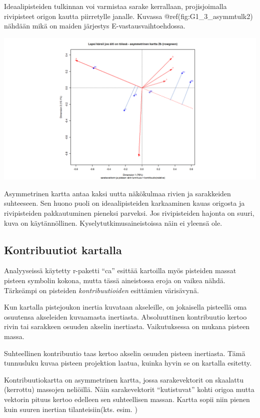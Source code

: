 \documentclass[
  finnish,
]{book}
\begin{document}
Ideaalipisteiden tulkinnan voi varmistaa sarake kerrallaan, projisjoimalla rivipisteet
origon kautta piirretylle janalle. Kuvassa @ref(fig:G1\_3\_asymmtulk2) nähdään mikä
on maiden järjestys E-vastausvaihtoehdossa.

\begin{center}\includegraphics[width=0.9\linewidth]{img/simpleCAasymmTulk2} \end{center}

Asymmetrinen kartta antaa kaksi uutta näkökulmaa rivien ja sarakkeiden suhteeseen.
Sen huono puoli on ideaalipisteiden karkaaminen kauas origosta ja rivipisteiden
pakkautuminen pieneksi parveksi. Jos rivipisteiden hajonta on suuri,
kuva on käytännöllinen. Kyselytutkimusaineistoissa näin ei yleensä ole.

\hypertarget{kontribuutiot-kartalla}{%
\subsection{Kontribuutiot kartalla}\label{kontribuutiot-kartalla}}

Analyyseissä käytetty r-paketti ``ca'' esittää kartoilla myös pisteiden massat pisteen
symbolin kokona, mutta tässä aineistossa eroja on vaikea nähdä. Tärkeämpi on pisteiden
\emph{kontribuutioiden} esittämien värisävynä.

Kun kartalla pistejoukon inertia kuvataan akseleille, on jokaisella pisteellä oma
osuutensa akseleiden kuvaamasta inertiasta. Absoluuttinen kontribuutio kertoo rivin
tai sarakkeen osuuden akselin inertiasta. Vaikutuksessa on mukana pisteen massa.

Suhteellinen kontribuutio taas kertoo akselin osuuden pisteen inertiasta.
Tämä tunnusluku kuvaa pisteen projektion laatua, kuinka hyvin se on kartalla esitetty.

Kontribuutiokartta on asymmetrinen kartta, jossa sarakevektorit on skaalattu
(kerrottu) massojen neliöillä. Näin sarakevektorit ``kutistuvat'' kohti origoa mutta
vektorin pituus kertoo edelleen sen suhteellisen massan. Kartta sopii niin pienen
kuin suuren inertian tilanteisiin(kts. esim. \citep{RefWorks:doc:5c768b09e4b02df9431e950a})
\end{document}
